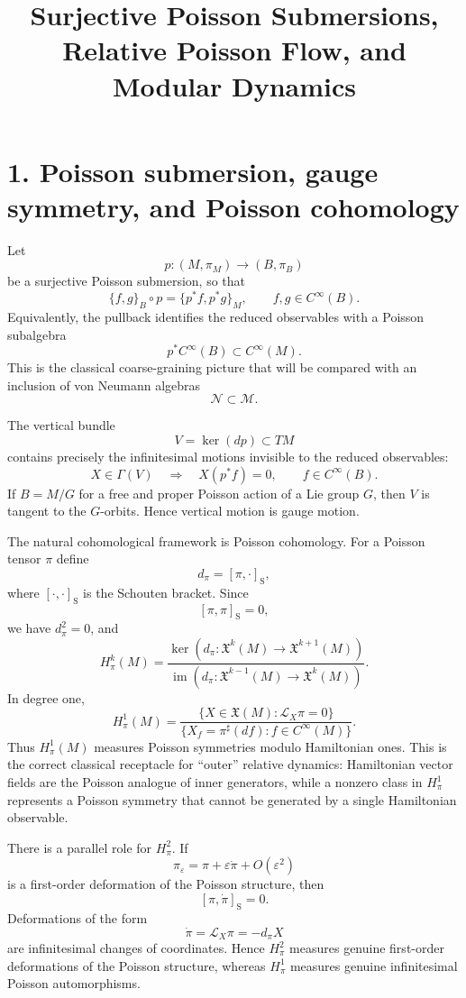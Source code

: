 \documentclass[11pt]{article}
\title{Surjective Poisson Submersions, Relative Poisson Flow, and Modular Dynamics}
\author{}
\date{}
\newcommand{\M}{\mathcal M}
\newcommand{\N}{\mathcal N}
\newcommand{\X}{\mathfrak X}
\newcommand{\cL}{\mathcal L}
\begin{document}
\maketitle
\vspace{-1.5em}

\section*{1. Poisson submersion, gauge symmetry, and Poisson cohomology}

Let
\[
p:(M,\pi_M)\longrightarrow (B,\pi_B)
\]
be a surjective Poisson submersion, so that
\[
\{f,g\}_B\circ p=\{p^*f,p^*g\}_M,
\qquad f,g\in C^\infty(B).
\]
Equivalently, the pullback identifies the reduced observables with a Poisson
subalgebra
\[
p^*C^\infty(B)\subset C^\infty(M).
\]
This is the classical coarse-graining picture that will be compared with an
inclusion of von Neumann algebras
\[
\N\subset\M.
\]

The vertical bundle
\[
V=\ker(dp)\subset TM
\]
contains precisely the infinitesimal motions invisible to the reduced
observables:
\[
X\in\Gamma(V)
\quad\Longrightarrow\quad
X(p^*f)=0,
\qquad f\in C^\infty(B).
\]
If $B=M/G$ for a free and proper Poisson action of a Lie group $G$, then $V$
is tangent to the $G$-orbits.  Hence vertical motion is gauge motion.

The natural cohomological framework is Poisson cohomology.  For a Poisson
tensor $\pi$ define
\[
d_\pi=[\pi,\cdot]_{\mathrm S},
\]
where $[\cdot,\cdot]_{\mathrm S}$ is the Schouten bracket.  Since
\[
[\pi,\pi]_{\mathrm S}=0,
\]
we have $d_\pi^2=0$, and
\[
H_\pi^k(M)
=
\frac{\ker(d_\pi:\X^k(M)\to\X^{k+1}(M))}
{\operatorname{im}(d_\pi:\X^{k-1}(M)\to\X^k(M))}.
\]
In degree one,
\[
H_\pi^1(M)
=
\frac{\{X\in\X(M):\cL_X\pi=0\}}
{\{X_f=\pi^\sharp(df):f\in C^\infty(M)\}}.
\]
Thus $H_\pi^1(M)$ measures Poisson symmetries modulo Hamiltonian ones.  This is
the correct classical receptacle for ``outer'' relative dynamics: Hamiltonian
vector fields are the Poisson analogue of inner generators, while a nonzero
class in $H_\pi^1$ represents a Poisson symmetry that cannot be generated by a
single Hamiltonian observable.

There is a parallel role for $H_\pi^2$.  If
\[
\pi_\varepsilon=\pi+\varepsilon\dot\pi+O(\varepsilon^2)
\]
is a first-order deformation of the Poisson structure, then
\[
[\pi,\dot\pi]_{\mathrm S}=0.
\]
Deformations of the form
\[
\dot\pi=\cL_X\pi=-d_\pi X
\]
are infinitesimal changes of coordinates.  Hence $H_\pi^2$ measures genuine
first-order deformations of the Poisson structure, whereas $H_\pi^1$ measures
genuine infinitesimal Poisson automorphisms.
\end{document}
